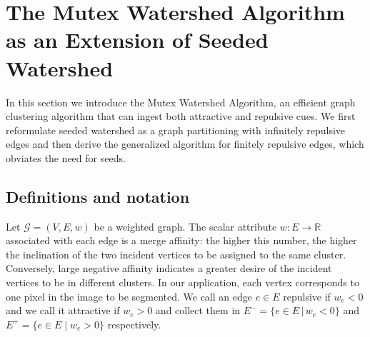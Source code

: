 




\section{The Mutex Watershed Algorithm as an Extension of Seeded Watershed} \label{3_methods}
In this section we introduce the Mutex Watershed Algorithm, an efficient graph clustering algorithm that can ingest both attractive and repulsive cues. We first reformulate seeded watershed as a graph partitioning with infinitely repulsive edges and then derive the generalized algorithm for finitely repulsive edges, which obviates the need for seeds.


\subsection{Definitions and notation}\label{sec:notation}
Let $\mathcal{G}=(V, E, w)$ be a weighted graph. 
The scalar attribute $w : E \rightarrow \mathbb{R}$ associated with each edge is a merge affinity: the higher this number, the higher the inclination of the two incident vertices to be assigned to the same cluster. Conversely, large negative affinity indicates a greater desire of the incident vertices to be in different clusters. In our application, each vertex corresponds to one pixel in the image to be segmented. 
We call an edge $e \in E$ repulsive if $w_{e}<0$ and we call it attractive if $w_{e}>0$ 
and collect them in $E^{-} = \{  e \in E \,|\, w_e < 0 \}$ and $E^{+} = \{ e \in E \; | \; w_e > 0 \}$ respectively.

